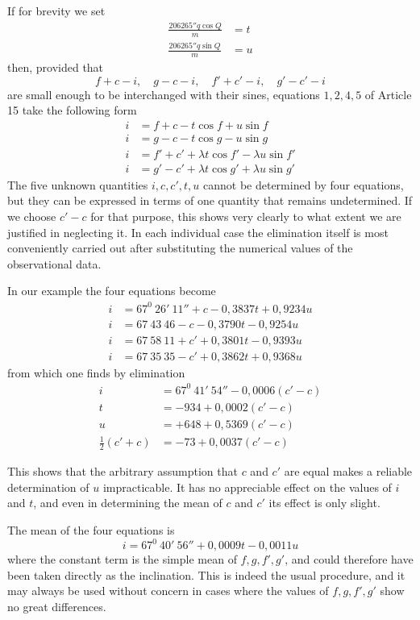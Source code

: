 If for brevity we set
\[
\begin{aligned}
\frac{206265''q\cos Q}{m}&=t\\
\frac{206265''q\sin Q}{m}&=u
\end{aligned}
\]
then, provided that
\[
f+c-i,\quad g-c-i,\quad f'+c'-i,\quad g'-c'-i
\]
are small enough to be interchanged with their sines, equations $1,2,4,5$ of Article 15 take the following form
\[
\begin{aligned}
i&=f+c-t\cos f+u\sin f\\
i&=g-c-t\cos g-u\sin g\\
i&=f'+c'+\lambda t\cos f'-\lambda u\sin f'\\
i&=g'-c'+\lambda t\cos g'+\lambda u\sin g'
\end{aligned}
\]
The five unknown quantities $i,c,c',t,u$ cannot be determined by four equations, but they can be expressed in terms of one quantity that remains undetermined. If we choose $c'-c$ for that purpose, this shows very clearly to what extent we are justified in neglecting it. In each individual case the elimination itself is most conveniently carried out after substituting the numerical values of the observational data.

In our example the four equations become
\[
\begin{aligned}
i&=67^0\ 26'\ 11''+c-0{,}3837t+0{,}9234u\\
i&=67\ 43\ 46-c-0{,}3790t-0{,}9254u\\
i&=67\ 58\ 11+c'+0{,}3801t-0{,}9393u\\
i&=67\ 35\ 35-c'+0{,}3862t+0{,}9368u
\end{aligned}
\]
from which one finds by elimination
\[
\begin{aligned}
i&=67^0\ 41'\ 54''-0{,}0006(c'-c)\\
t&=-934+0{,}0002(c'-c)\\
u&=+648+0{,}5369(c'-c)\\
\tfrac12(c'+c)&=-73+0{,}0037(c'-c)
\end{aligned}
\]

This shows that the arbitrary assumption that $c$ and $c'$ are equal makes a reliable determination of $u$ impracticable. It has no appreciable effect on the values of $i$ and $t$, and even in determining the mean of $c$ and $c'$ its effect is only slight.

The mean of the four equations is
\[
i=67^0\ 40'\ 56''+0{,}0009t-0{,}0011u
\]
where the constant term is the simple mean of $f,g,f',g'$, and could therefore have been taken directly as the inclination. This is indeed the usual procedure, and it may always be used without concern in cases where the values of $f,g,f',g'$ show no great differences.

